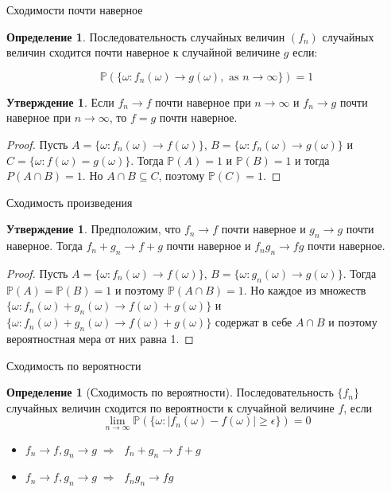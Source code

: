 \documentclass{beamer}%
\theoremstyle{definition}
\newtheorem{mydef}[theorem]{Определение}
\newtheorem{proposition}[theorem]{Утверждение}
\renewcommand{\P}{\mathbb{P}}
\begin{document}
\begin{frame}{Сходимости почти наверное}

\begin{mydef}
Последовательность случайных величин $(f_n)$ случайных величин сходится почти наверное к случайной величине $g$ если:

\[\P(\{\omega: f_n(\omega) \rightarrow g(\omega), \text{ as } n \rightarrow \infty\}) = 1\]
\end{mydef}

\begin{proposition}
Если $f_n \rightarrow f$ почти наверное при $n \rightarrow \infty$  и  $f_n \rightarrow g$ почти наверное при $n \rightarrow \infty$, то $f = g$ почти наверное.
\end{proposition}  

\begin{proof}
    Пусть $A = \{\omega: f_n(\omega) \rightarrow f(\omega)\}$, $B = \{\omega: f_n(\omega) \rightarrow g(\omega)\}$ и $C = \{\omega: f(\omega) = g(\omega)\}$. Тогда $\P(A) = 1$ и $\P(B) = 1$ и тогда $P(A \cap B) = 1$. Но $A \cap B \subseteq C$, поэтому $\P(C) = 1$.
\end{proof}


\end{frame}


\begin{frame}{Сходимость произведения}
\begin{proposition}
Предположим, что $f_n \rightarrow f$ почти наверное и $g_n \rightarrow g$ почти наверное. Тогда $f_n + g_n \rightarrow f + g$ почти наверное и $f_n g_n \rightarrow fg$ почти наверное.
\end{proposition}

\begin{proof}
Пусть $A = \{\omega: f_n(\omega) \rightarrow f(\omega)\}$, $B = \{\omega: g_n(\omega) \rightarrow g(\omega)\}$. Тогда $\P(A) = \P(B) = 1$ и поэтому $\P(A \cap B) = 1$. Но каждое из множеств $\{\omega : f_n(\omega) + g_n(\omega) \rightarrow f(\omega) + g(\omega)\} $ и $\{\omega : f_n(\omega) + g_n(\omega) \rightarrow f(\omega) + g(\omega)\} $ содержат в себе $A \cap B$ и поэтому вероятностная мера от них равна 1.
\end{proof}

\end{frame}




\begin{frame}{Сходимость по вероятности}
\begin{mydef}[Сходимость по вероятности]
Последовательность $\{f_n\}$ случайных величин сходится по вероятности к случайной величине $f$, если
$$
\lim_{n \to \infty} \P(\{\omega: |f_n(\omega) -f(\omega)| \geq \epsilon\}) = 0
$$
\end{mydef}
    
\begin{itemize}
    \item $f_n \to f, g_n \to g \; \Rightarrow \;$ $f_n + g_n \to f + g$ 
    \item $f_n \to f, g_n \to g \; \Rightarrow \;$ $f_ng_n \to fg$ 
\end{itemize}
    
\end{frame}
\end{document}
